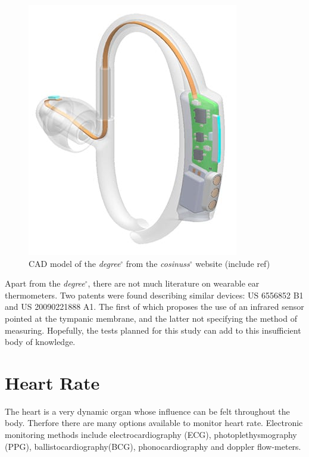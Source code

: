 \medskip

\begin{figure}[h]
   \centering
   \includegraphics[scale=0.5]{figs/Degree}
   \caption{CAD model of the \textit{degree}$^{\circ}$ from the \textit{cosinuss}$^{\circ}$ website (include ref)}
   \label{fig:Degree}
\end{figure}

Apart from the \textit{degree}$^{\circ}$, there are not much literature on wearable ear thermometers. Two patents were found describing similar devices: US 6556852 B1 and US 20090221888 A1. The first of which proposes the use of an infrared sensor pointed at the tympanic membrane, and the latter not specifying the method of measuring. Hopefully, the tests planned for this study can add to this insufficient body of knowledge.

\section{Heart Rate}
The heart is a very dynamic organ whose influence can be felt throughout the body. Therfore there are many options available to monitor heart rate. Electronic monitoring methods include electrocardiography (ECG), photoplethysmography (PPG), ballistocardiography(BCG), phonocardiography and doppler flow-meters.

